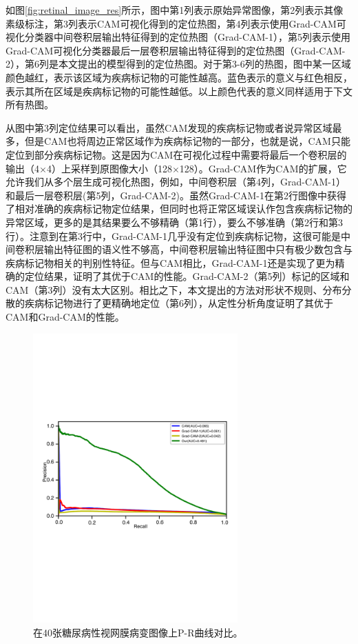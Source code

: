 如图\ref{fig:retinal_image_res}所示，图中第1列表示原始异常图像，第2列表示其像素级标注，第3列表示CAM可视化得到的定位热图，第4列表示使用Grad-CAM可视化分类器中间卷积层输出特征得到的定位热图（Grad-CAM-1），第5列表示使用Grad-CAM可视化分类器最后一层卷积层输出特征得到的定位热图（Grad-CAM-2），第6列是本文提出的模型得到的定位热图。对于第3-6列的热图，图中某一区域颜色越红，表示该区域为疾病标记物的可能性越高。蓝色表示的意义与红色相反，表示其所在区域是疾病标记物的可能性越低。以上颜色代表的意义同样适用于下文所有热图。

从图中第3列定位结果可以看出，虽然CAM发现的疾病标记物或者说异常区域最多，但是CAM也将周边正常区域作为疾病标记物的一部分，也就是说，CAM只能定位到部分疾病标记物。这是因为CAM在可视化过程中需要将最后一个卷积层的输出（4$\times$4）上采样到原图像大小（128$\times$128）。Grad-CAM作为CAM的扩展，它允许我们从多个层生成可视化热图，例如，中间卷积层（第4列，Grad-CAM-1）和最后一层卷积层(第5列，Grad-CAM-2)。虽然Grad-CAM-1在第2行图像中获得了相对准确的疾病标记物定位结果，但同时也将正常区域误认作包含疾病标记物的异常区域，更多的是其结果要么不够精确（第1行），要么不够准确（第2行和第3行）。注意到在第3行中，Grad-CAM-1几乎没有定位到疾病标记物，这很可能是中间卷积层输出特征图的语义性不够高，中间卷积层输出特征图中只有极少数包含与疾病标记物相关的判别性特征。但与CAM相比，Grad-CAM-1还是实现了更为精确的定位结果，证明了其优于CAM的性能。Grad-CAM-2（第5列）标记的区域和CAM（第3列）没有太大区别。相比之下，本文提出的方法对形状不规则、分布分散的疾病标记物进行了更精确地定位（第6列），从定性分析角度证明了其优于CAM和Grad-CAM的性能。
\begin{figure}[h!]
	\centering
	\includegraphics[width=0.7\textwidth]{figure/pr_curve_retinal_image/pr_curve}
	\caption[在40张糖尿病性视网膜病变图像上P-R曲线对比]{在40张糖尿病性视网膜病变图像上P-R曲线对比。}
	\label{fig:retinal_image_pr_curve}
\end{figure}


